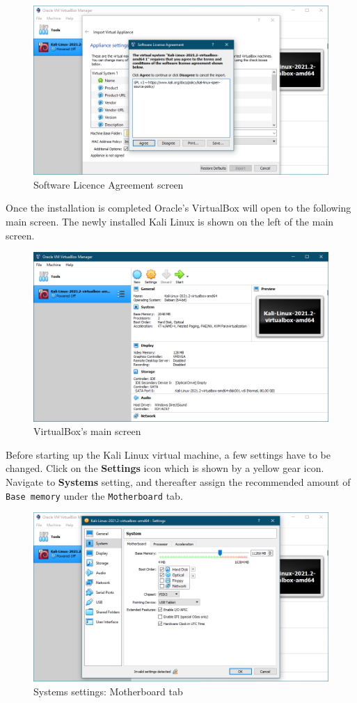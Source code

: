 \documentclass[a4paper, 12pt, titlepage]{report}
\begin{document}
\begin{figure}[H]
    \centering
    \includegraphics[scale=0.5]{pics/vbkali2.PNG}
    \caption{Software Licence Agreement screen}
\end{figure}
Once the installation is completed Oracle's VirtualBox will open to the following main screen. The newly installed Kali Linux is shown on the left of the main screen.
\begin{figure}[H]
    \centering
    \includegraphics[scale=0.5]{pics/vbkalimain.PNG}
    \caption{VirtualBox's main screen}
\end{figure}
Before starting up the Kali Linux virtual machine, a few settings have to be changed. Click on the \textbf{Settings} icon which is shown by a yellow gear icon. Navigate to \textbf{Systems} setting, and thereafter assign the recommended amount of \texttt{Base memory} under the \texttt{Motherboard} tab.
\begin{figure}[H]
    \centering
    \includegraphics[scale=0.5]{pics/settings1.PNG}
    \caption{Systems settings: Motherboard tab}
\end{figure}
\end{document}
